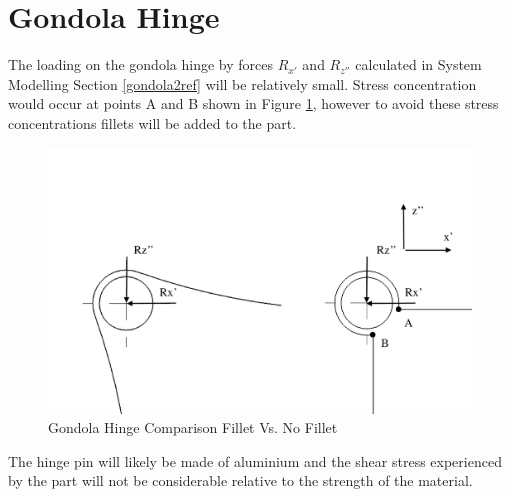 \documentclass[../main.tex]{subfiles}
\begin{document}
\section{Gondola Hinge} \label{appendix:gondolaHinge}

The loading on the gondola hinge by forces $R_{x'}$ and $R_{z''}$ calculated in System Modelling Section \ref{gondola2ref} will be relatively small. Stress concentration would occur at points A and B shown in Figure \ref{fig:fillethinge}, however to avoid these stress concentrations fillets will be added to the part. 

\begin{figure}[H]
	\centering
	\includegraphics[width=1\textwidth]{img/gondola/filletHinge.PNG}
	\caption{Gondola Hinge Comparison Fillet Vs. No Fillet}
	\label{fig:fillethinge}
\end{figure}

The hinge pin will likely be made of aluminium and the shear stress experienced by the part will not be considerable relative to the strength of the material. 
\end{document}
